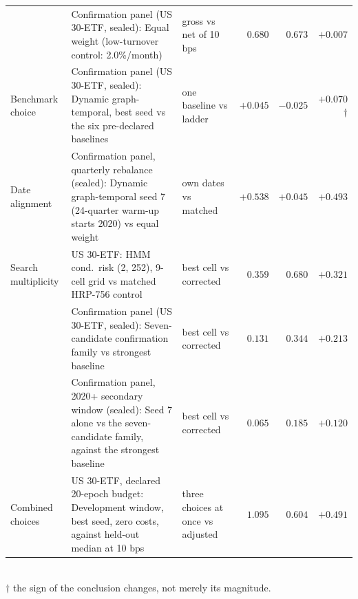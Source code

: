 \begin{table}[t]
\begin{tabular}{p{2.6cm}p{5.0cm}p{4.2cm}rrr}
 & Confirmation panel (US 30-ETF, sealed): Equal weight (low-turnover control: 2.0\%/month) & gross vs net of 10\,bps & $0.680$ & $0.673$ & $\mathbf{+0.007}$ \\
\addlinespace[2pt]
Benchmark choice & Confirmation panel (US 30-ETF, sealed): Dynamic graph-temporal, best seed vs the six pre-declared baselines & one baseline vs ladder & $+0.045$ & $-0.025$ & $\mathbf{+0.070}$\,$\dagger$ \\
\addlinespace[2pt]
Date alignment & Confirmation panel, quarterly rebalance (sealed): Dynamic graph-temporal seed 7 (24-quarter warm-up starts 2020) vs equal weight & own dates vs matched & $+0.538$ & $+0.045$ & $\mathbf{+0.493}$ \\
\addlinespace[2pt]
Search multiplicity & US 30-ETF: HMM cond.\ risk (2, 252), 9-cell grid vs matched HRP-756 control & best cell vs corrected & $0.359$ & $0.680$ & $\mathbf{+0.321}$ \\
 & Confirmation panel (US 30-ETF, sealed): Seven-candidate confirmation family vs strongest baseline & best cell vs corrected & $0.131$ & $0.344$ & $\mathbf{+0.213}$ \\
 & Confirmation panel, 2020+ secondary window (sealed): Seed 7 alone vs the seven-candidate family, against the strongest baseline & best cell vs corrected & $0.065$ & $0.185$ & $\mathbf{+0.120}$ \\
\addlinespace[2pt]
Combined choices & US 30-ETF, declared 20-epoch budget: Development window, best seed, zero costs, against held-out median at 10 bps & three choices at once vs adjusted & $1.095$ & $0.604$ & $\mathbf{+0.491}$ \\
\bottomrule
\end{tabular}
\\[2pt]
\footnotesize $\dagger$ the sign of the conclusion changes, not merely its magnitude.
\end{table}
